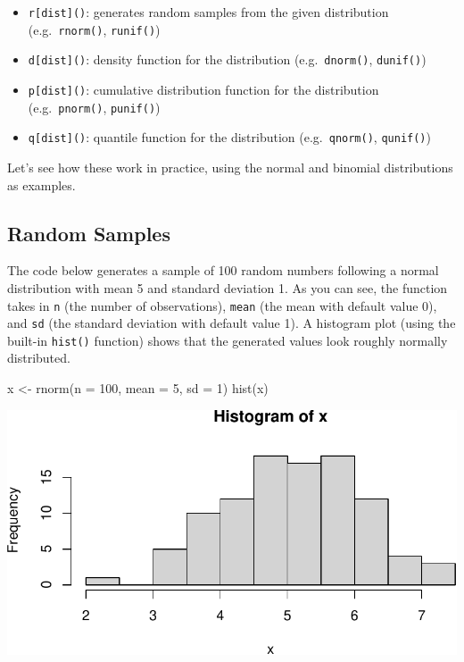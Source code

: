 \documentclass[
  letterpaper,
]{krantz}
\makeatletter
\newenvironment{Shaded}{\begin{snugshade}}{\end{snugshade}}
\newcommand{\AttributeTok}[1]{\textcolor[rgb]{0.40,0.45,0.13}{#1}}
\newcommand{\DecValTok}[1]{\textcolor[rgb]{0.68,0.00,0.00}{#1}}
\newcommand{\FunctionTok}[1]{\textcolor[rgb]{0.28,0.35,0.67}{#1}}
\newcommand{\NormalTok}[1]{\textcolor[rgb]{0.00,0.23,0.31}{#1}}
\newcommand{\OtherTok}[1]{\textcolor[rgb]{0.00,0.23,0.31}{#1}}
\providecommand{\tightlist}{%
  \setlength{\itemsep}{0pt}\setlength{\parskip}{0pt}}\usepackage{longtable,booktabs,array}
\newenvironment{kframe}{%
\medskip{}
\setlength{\fboxsep}{.8em}
 \def\at@end@of@kframe{}%
 \ifinner\ifhmode%
  \def\at@end@of@kframe{\end{minipage}}%
  \begin{minipage}{\columnwidth}%
 \fi\fi%
 \def\FrameCommand##1{\hskip\@totalleftmargin \hskip-\fboxsep
 \colorbox{shadecolor}{##1}\hskip-\fboxsep
     \hskip-\linewidth \hskip-\@totalleftmargin \hskip\columnwidth}%
 \MakeFramed {\advance\hsize-\width
   \@totalleftmargin\z@ \linewidth\hsize
   \@setminipage}}%
 {\par\unskip\endMakeFramed%
 \at@end@of@kframe}
\renewenvironment{Shaded}{\begin{kframe}}{\end{kframe}}
\makeatother
\begin{document}
\begin{itemize}
\tightlist
\item
  \texttt{r{[}dist{]}()}: generates random samples from the given
  distribution (e.g.~\texttt{rnorm()}, \texttt{runif()})\\
\item
  \texttt{d{[}dist{]}()}: density function for the distribution
  (e.g.~\texttt{dnorm()}, \texttt{dunif()})\\
\item
  \texttt{p{[}dist{]}()}: cumulative distribution function for the
  distribution (e.g.~\texttt{pnorm()}, \texttt{punif()})\\
\item
  \texttt{q{[}dist{]}()}: quantile function for the distribution
  (e.g.~\texttt{qnorm()}, \texttt{qunif()})
\end{itemize}

Let's see how these work in practice, using the normal and binomial
distributions as examples.

\subsection{Random Samples}\label{random-samples}

The code below generates a sample of 100 random numbers following a
normal distribution with mean 5 and standard deviation 1. As you can
see, the function takes in \texttt{n} (the number of observations),
\texttt{mean} (the mean with default value 0), and \texttt{sd} (the
standard deviation with default value 1). A histogram plot (using the
built-in \texttt{hist()} function) shows that the generated values look
roughly normally distributed.

\begin{Shaded}
\begin{Highlighting}[]
\NormalTok{x }\OtherTok{\textless{}{-}} \FunctionTok{rnorm}\NormalTok{(}\AttributeTok{n =} \DecValTok{100}\NormalTok{, }\AttributeTok{mean =} \DecValTok{5}\NormalTok{, }\AttributeTok{sd =} \DecValTok{1}\NormalTok{)}
\FunctionTok{hist}\NormalTok{(x)}
\end{Highlighting}
\end{Shaded}

\begin{center}
\includegraphics[width=1\textwidth,height=\textheight]{book/distributions_files/figure-pdf/unnamed-chunk-4-1.pdf}
\end{center}
\end{document}
